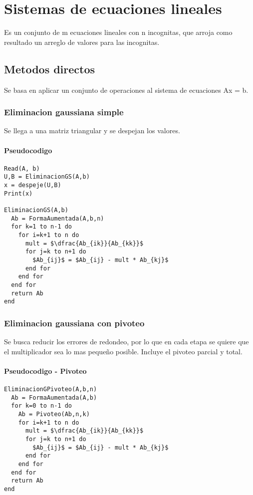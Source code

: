 \documentclass[11pt]{article}
\begin{document}
\newpage
\section{Sistemas de ecuaciones lineales}
Es un conjunto de m ecuaciones lineales con n incognitas, que arroja como resultado un arreglo de valores para las incognitas.
\subsection{Metodos directos}
Se basa en aplicar un conjunto de operaciones al sistema de ecuaciones Ax = b.
\subsubsection{Eliminacion gaussiana simple}
Se llega a una matriz triangular y se despejan los valores.
\paragraph{Pseudocodigo\\}
\begin{lstlisting}[frame=single, mathescape=true]
Read(A, b)
U,B = EliminacionGS(A,b)
x = despeje(U,B)
Print(x)

EliminacionGS(A,b)
  Ab = FormaAumentada(A,b,n)
  for k=1 to n-1 do
    for i=k+1 to n do
      mult = $\dfrac{Ab_{ik}}{Ab_{kk}}$
      for j=k to n+1 do
        $Ab_{ij}$ = $Ab_{ij} - mult * Ab_{kj}$
      end for
    end for
  end for
  return Ab
end 
\end{lstlisting}
\subsubsection{Eliminacion gaussiana con pivoteo}
Se busca reducir los errores de redondeo, por lo que en cada etapa se quiere que el multiplicador sea lo mas pequeño posible. Incluye el pivoteo parcial y total.
\paragraph{Pseudocodigo - Pivoteo\\}
\begin{lstlisting}[frame=single, mathescape=true]
EliminacionGPivoteo(A,b,n)
  Ab = FormaAumentada(A,b)
  for k=0 to n-1 do
    Ab = Pivoteo(Ab,n,k)
    for i=k+1 to n do
      mult = $\dfrac{Ab_{ik}}{Ab_{kk}}$
      for j=k to n+1 do
        $Ab_{ij}$ = $Ab_{ij} - mult * Ab_{kj}$
      end for
    end for
  end for
  return Ab
end 
\end{lstlisting}
\end{document}
